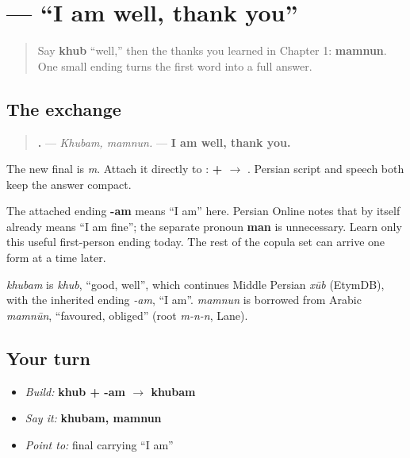 \section[\texorpdfstring{\fa{خوبم،} \fa{ممنون} (khubam, mamnun)}{خوبم، ممنون (khubam, mamnun)}]{  — “I am well, thank you”}

\label{lesson:FA-C04-khubam}



\begin{quote}
Say \textbf{khub} “well,” then the thanks you learned in Chapter 1: \textbf{mamnun}. One small ending turns the first word into a full answer.
\end{quote}

\subsection*{The exchange}
\begin{quote}
\textbf{ .} — \emph{Khubam, mamnun.} — \textbf{I am well, thank you.}
\end{quote}

The new final \textbf{} is \emph{m}. Attach it directly to \textbf{}: \textbf{ +  $\to$ }. Persian script and speech both keep the answer compact.

\begin{grammarlens}[title={Grammar Lens: one copula ending, not a table}]
The attached ending \textbf{-am} means “I am” here. Persian Online notes that \textbf{} by itself already means “I am fine”; the separate pronoun \textbf{man} is unnecessary. Learn only this useful first-person ending today. The rest of the copula set can arrive one form at a time later.
\end{grammarlens}

\begin{cousinweb}
\emph{khubam} is \emph{khub}, \textquotedblleft{}good, well\textquotedblright{}, which continues Middle Persian \emph{xūb} (EtymDB), with the inherited ending \emph{-am}, \textquotedblleft{}I am\textquotedblright{}. \emph{mamnun} is borrowed from Arabic \emph{mamnūn}, \textquotedblleft{}favoured, obliged\textquotedblright{} (root \emph{m-n-n}, Lane).
\end{cousinweb}

\subsection*{Your turn}
\begin{itemize}
\raggedright
  \item \emph{Build:} \textbf{khub + -am $\to$ khubam}
  \item \emph{Say it:} \textbf{khubam, mamnun}
  \item \emph{Point to:} final \textbf{} carrying “I am”
\end{itemize}

